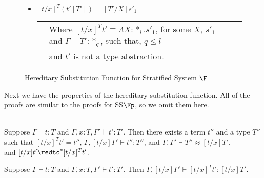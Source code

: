 \begin{figure}[t]
\begin{itemize}
    \item[] $[t/x]^{T} (t'[T']) = [T'/X]s'_1$\\
      \begin{tabular}{lll}
        & Where $[t/x]^{T} t' \equiv \Lambda X:*_l.s'_1$,
        for some $X$, $s'_1$ and $\Gamma \vdash T':*_q$, such that, $q \leq l$\\
	& and $t'$ is not a type abstraction.
      \end{tabular}
  \end{itemize}
  \caption{Hereditary Substitution Function for Stratified System $\F$}
  \label{fig:hereditary_substitution_function_ssfe}
\end{figure}
Next we have the properties of the hereditary substitution function.
All of the proofs are similar to the proofs for SS$\Fp$, so we omit
them here.
\begin{lemma}
  \label{lemma:total_ssfe}
  \,\\ Suppose $\Gamma \vdash t : T$ and $\Gamma, x:T, \Gamma' \vdash t':T'$.  Then
  there exists a term $t''$ and a type $T''$ such that $[t/x]^T t' = t''$, 
  $\Gamma,[t/x]\Gamma' \vdash t'':T''$, and $\Gamma,\Gamma' \vdash T'' \approx [t/x]T'$, \\
  and $[t/x]t' \redto^* [t/x]^T t'$.  
\end{lemma}

\begin{corollary}
  \label{corollary:type_preserving_ssfe}
  Suppose $\Gamma \vdash t : T$ and $\Gamma, x:T, \Gamma' \vdash t':T'$. Then
  $\Gamma,[t/x]\Gamma' \vdash [t/x]^T t':[t/x]T'$.
\end{corollary}

